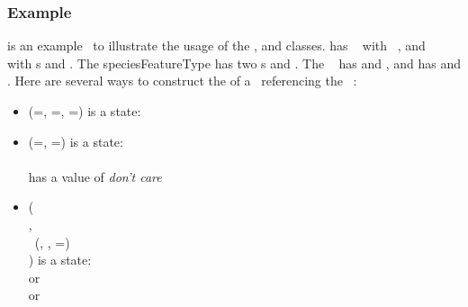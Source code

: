 \subsubsection{Example}
\label{def:SpeciesFeature:Example}

 is an example \speciesType\ to illustrate the usage of the \ListOfSpeciesFeatures, \SubListOfSpeciesFeatures and \SpeciesFeature classes.   has \speciesTypeInstance\  with \speciesFeatureType\ , and \speciesTypeInstance\  with \speciesFeatureType s  and . The speciesFeatureType  has two \possibleSpeciesFeatureValue s  and . The \speciesFeatureType\  has  and , and  has  and . Here are several ways to construct the \listOfSpeciesFeatures of a \species\ referencing the \speciesType\ :
\begin{itemize}
 \item 
   \listOfSpeciesFeatures (=, =,  =) is a state: \\ 
 \item 
    \listOfSpeciesFeatures (=, =) is a state:\\ 
     \\
     has a value of \emph{don't care}
 \item 
   \listOfSpeciesFeatures (\\
   \parindent 20pt 
   \indent {},\\
   \indent \subListOfSpeciesFeatures\ (,  , =)\\
 ) is a state: \\ 
    or \\
    or \\
\end{itemize}

